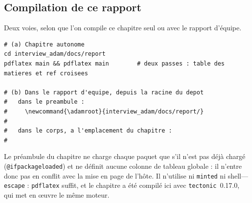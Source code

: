 \subsection{Compilation de ce rapport}

Deux voies, selon que l'on compile ce chapitre seul ou avec le rapport d'équipe.

\begin{lstlisting}[style=adamshell]
# (a) Chapitre autonome
cd interview_adam/docs/report
pdflatex main && pdflatex main        # deux passes : table des matieres et ref croisees

# (b) Dans le rapport d'equipe, depuis la racine du depot
#   dans le preambule :
#     \newcommand{\adamroot}{interview_adam/docs/report/}
#     
#   dans le corps, a l'emplacement du chapitre :
#     
\end{lstlisting}

Le préambule du chapitre ne charge chaque paquet que s'il n'est pas déjà chargé
(\texttt{@ifpackageloaded}) et ne définit aucune colonne de tableau globale : il
n'entre donc pas en conflit avec la mise en page de l'hôte. Il n'utilise ni
\texttt{minted} ni shell---\texttt{escape} : \texttt{pdflatex} suffit, et le
chapitre a été compilé ici avec \texttt{tectonic}~0.17.0, qui met en œuvre le
même moteur.

